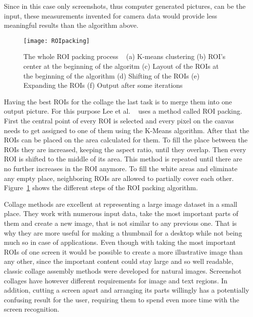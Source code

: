 \documentclass[draft,final]{vutinfth} %
\begin{document}
	Since in this case only screenshots, thus computer generated pictures, can be the input, these measurements invented for camera data would provide less meaningful results than the algorithm above.\par 
	\begin{figure}[h]
		\centering		
		\texttt{[image: ROIpacking]}
		\caption{The whole ROI packing process ~\cite{lee2010mobile} (a) K-means clustering (b) ROI's center at the beginning of the algoritm (c) Layout of the ROIs at the beginning of the algorithm (d) Shifting of the ROIs (e) Expanding the ROIs (f) Output after some iterations}
		\label{fig:ROIpacking}
	\end{figure}
	Having the best ROIs for the collage the last task is to merge them into one output picture.
	For this purpose Lee et al. ~\cite{lee2010mobile} uses a method called ROI packing.
	First the central point of every ROI is selected and every pixel on the canvas needs to get assigned to one of them using the K-Means algorithm.
	After that the ROIs can be placed on the area calculated for them.
	To fill the place between the ROIs they are increased, keeping the aspect ratio, until they overlap. 
	Then every ROI is shifted to the middle of its area.
	This method is repeated until there are no further increases in the ROI anymore.
	To fill the white areas and eliminate any empty place, neighboring ROIs are allowed to partially cover each other.
	Figure~\ref{fig:ROIpacking} shows the different steps of the ROI packing algorithm.\par 
	Collage methods are excellent at representing a large image dataset in a small place.
	They work with numerous input data, take the most important parts of them and create a new image, that is not similar to any previous one.
	That is why they are more useful for making a thumbnail for a desktop while not being much so in case of applications.
	Even though with taking the most important ROIs of one screen it would be possible to create a  more illustrative image than any other, since the important content could stay large and so well readable, classic collage assembly methods were developed for natural images.
	Screenshot collages have however different requirements for image and text regions.
	In addition, cutting a screen apart and arranging its parts willingly has a potentially confusing result for the user, requiring them to spend even more time with the screen recognition.
	
\end{document}

